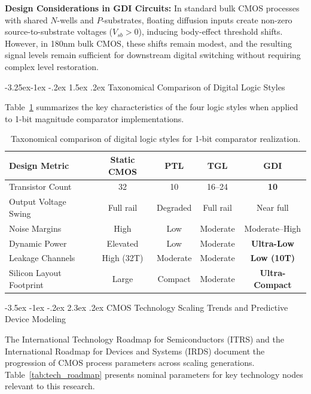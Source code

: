 \documentclass[12pt,a4paper,oneside]{report}
\makeatletter
\renewcommand\section{\@startsection {section}{1}{\z@}%
                                   {-3.5ex \@plus -1ex \@minus -.2ex}%
                                   {2.3ex \@plus.2ex}%
                                   {\normalfont\normalsize\bfseries}}
\renewcommand\subsection{\@startsection{subsection}{2}{\z@}%
                                     {-3.25ex\@plus -1ex \@minus -.2ex}%
                                     {1.5ex \@plus .2ex}%
                                     {\normalfont\normalsize\bfseries\itshape}}
\makeatother
\begin{document}
\noindent\textbf{Design Considerations in GDI Circuits:}
In standard bulk CMOS processes with shared $N$-wells and $P$-substrates, floating diffusion inputs create non-zero source-to-substrate voltages ($V_{sb} > 0$), inducing body-effect threshold shifts. However, in 180nm bulk CMOS, these shifts remain modest, and the resulting signal levels remain sufficient for downstream digital switching without requiring complex level restoration.

\subsection{Taxonomical Comparison of Digital Logic Styles}

Table~\ref{tab:logic_styles_summary} summarizes the key characteristics of the four logic styles when applied to 1-bit magnitude comparator implementations.

\begin{table}[H]
\centering
\caption{Taxonomical comparison of digital logic styles for 1-bit comparator realization.}
\label{tab:logic_styles_summary}
\vspace{0.2cm}
\begin{tabular}{|p{3.2cm}|c|c|c|c|}
\hline
\textbf{Design Metric} & \textbf{Static CMOS} & \textbf{PTL} & \textbf{TGL} & \textbf{GDI} \\
\hline
Transistor Count & 32 & 10 & 16--24 & \textbf{10} \\
\hline
Output Voltage Swing & Full rail & Degraded & Full rail & Near full \\
\hline
Noise Margins & High & Low & Moderate & Moderate--High \\
\hline
Dynamic Power & Elevated & Low & Moderate & \textbf{Ultra-Low} \\
\hline
Leakage Channels & High (32T) & Moderate & Moderate & \textbf{Low (10T)} \\
\hline
Silicon Layout Footprint & Large & Compact & Moderate & \textbf{Ultra-Compact} \\
\hline
\end{tabular}
\end{table}

\section{CMOS Technology Scaling Trends and Predictive Device Modeling}

The International Technology Roadmap for Semiconductors (ITRS) and the International Roadmap for Devices and Systems (IRDS) document the progression of CMOS process parameters across scaling generations. Table~\ref{tab:tech_roadmap} presents nominal parameters for key technology nodes relevant to this research.
\end{document}
